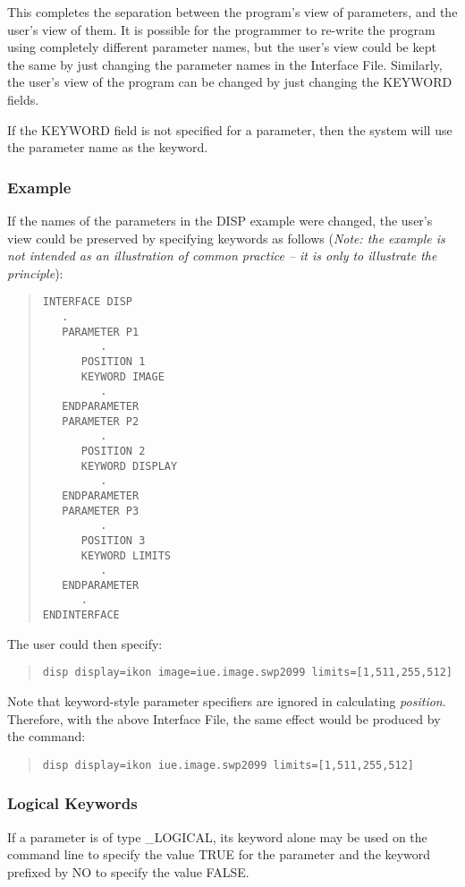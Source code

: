 This completes the separation between the program's
view of parameters, and the user's view of them. It is possible for the
programmer to re-write the program using completely different parameter
names, but the user's view could be kept the same by just changing the 
parameter names in the Interface File. Similarly, the
user's view of the program can be changed by just changing the
KEYWORD fields.

If the KEYWORD field is not specified for a parameter, then the system will
use the parameter name as the keyword.

\subsubsection*{Example}
If the names of the parameters in the DISP example were changed,
the user's view could be preserved by specifying keywords as follows
({\em Note: the example is not intended as an
illustration of common practice -- it is only to illustrate the
principle}\/):
\begin{quote} \begin{verbatim}
INTERFACE DISP
   .
   PARAMETER P1
         .
      POSITION 1
      KEYWORD IMAGE
         .
   ENDPARAMETER
   PARAMETER P2
         .
      POSITION 2
      KEYWORD DISPLAY
         .
   ENDPARAMETER
   PARAMETER P3
         .
      POSITION 3
      KEYWORD LIMITS
         .
   ENDPARAMETER
      .
ENDINTERFACE
\end{verbatim} \end{quote}
The user could then specify:
\begin{quote} \begin{verbatim}
disp display=ikon image=iue.image.swp2099 limits=[1,511,255,512]
\end{verbatim} \end{quote}
Note that keyword-style parameter specifiers are ignored in calculating
{\em position}.
Therefore, with the above Interface File, the same effect would be produced
by the command:
\begin{quote} \begin{verbatim}
disp display=ikon iue.image.swp2099 limits=[1,511,255,512]
\end{verbatim} \end{quote}

\subsubsection*{Logical Keywords}
If a parameter is of type \_LOGICAL, its keyword alone may be used on
the command line to specify the value TRUE for the parameter and the 
keyword prefixed by NO to specify the value FALSE.


